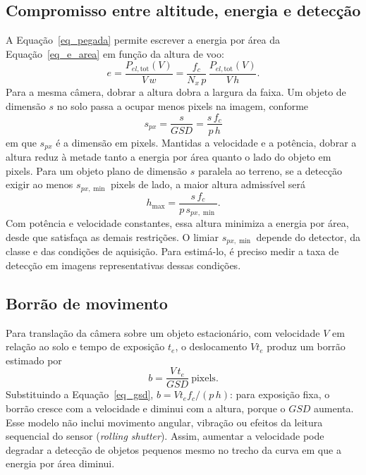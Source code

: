 \subsection{Compromisso entre altitude, energia e detecção}
\label{sec_compromisso_altitude}

A Equação~\eqref{eq_pegada} permite escrever a energia por área da Equação~\eqref{eq_e_area} em função da altura de voo:
\begin{equation}
  e = \frac{P_{el,\mathrm{tot}}(V)}{V\,w}
    = \frac{f_c}{N_x\,p}\,\frac{P_{el,\mathrm{tot}}(V)}{V\,h}.
  \label{eq_e_h}
\end{equation}
Para a mesma câmera, dobrar a altura dobra a largura da faixa. Um objeto de dimensão $s$ no solo passa a ocupar menos pixels na imagem, conforme
\begin{equation}
  s_{px} = \frac{s}{GSD} = \frac{s\,f_c}{p\,h}
  \label{eq_spx}
\end{equation}
em que $s_{px}$ é a dimensão em pixels. Mantidas a velocidade e a potência, dobrar a altura reduz à metade tanto a energia por área quanto o lado do objeto em pixels. Para um objeto plano de dimensão $s$ paralela ao terreno, se a detecção exigir ao menos $s_{px,\min}$ pixels de lado, a maior altura admissível será
\begin{equation}
  h_{\max} = \frac{s\,f_c}{p\,s_{px,\min}}.
  \label{eq_hmax}
\end{equation}
Com potência e velocidade constantes, essa altura minimiza a energia por área, desde que satisfaça as demais restrições. O limiar $s_{px,\min}$ depende do detector, da classe e das condições de aquisição. Para estimá-lo, é preciso medir a taxa de detecção em imagens representativas dessas condições.

\subsection{Borrão de movimento}

Para translação da câmera sobre um objeto estacionário, com velocidade $V$ em relação ao solo e tempo de exposição $t_e$, o deslocamento $V t_e$ produz um borrão estimado por \cite[Eq.~(6)]{oconnor2017cameras}
\begin{equation}
  b = \frac{V\,t_e}{GSD}\ \text{pixels}.
  \label{eq_borrao}
\end{equation}
Substituindo a Equação~\eqref{eq_gsd}, $b = V t_e f_c/(p\,h)$: para exposição fixa, o borrão cresce com a velocidade e diminui com a altura, porque o $GSD$ aumenta. Esse modelo não inclui movimento angular, vibração ou efeitos da leitura sequencial do sensor (\textit{rolling shutter}). Assim, aumentar a velocidade pode degradar a detecção de objetos pequenos mesmo no trecho da curva em que a energia por área diminui.

